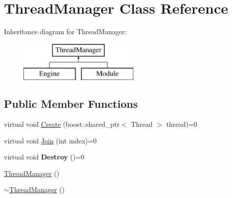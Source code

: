 \hypertarget{classThreadManager}{
\section{ThreadManager Class Reference}
\label{de/d57/classThreadManager}
}
Inheritance diagram for ThreadManager:\begin{figure}[H]
\begin{center}
\leavevmode
\includegraphics[height=2cm]{de/d57/classThreadManager}
\end{center}
\end{figure}
\subsection*{Public Member Functions}
\begin{DoxyCompactItemize}
\item 
virtual void \hyperlink{classThreadManager_afad6766592d98c6c0a2129f45e6a346e}{Create} (boost::shared\_\-ptr$<$ Thread $>$ thread)=0
\item 
virtual void \hyperlink{classThreadManager_a3c1b72b44ca4ffa3652088d44937b9d0}{Join} (int index)=0
\item 
\hypertarget{classThreadManager_abf5f1ccc763d5ecb13a8043552120741}{
virtual void {\bfseries Destroy} ()=0}
\label{de/d57/classThreadManager_abf5f1ccc763d5ecb13a8043552120741}

\item 
\hyperlink{classThreadManager_a613b13ebf45502e4d86c2f9317ec5871}{ThreadManager} ()
\item 
\hyperlink{classThreadManager_a18eb12d3d752075318c3672c8efffd5b}{$\sim$ThreadManager} ()
\end{DoxyCompactItemize}


